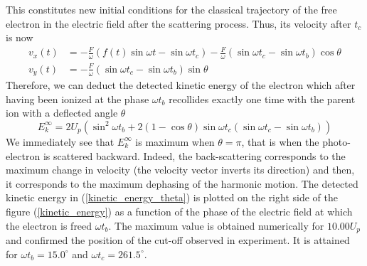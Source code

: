 \documentclass[a4paper]{article}
\begin{document}
This constitutes new initial conditions for the classical trajectory of the free electron in the electric field after the scattering process. Thus, its velocity after $t_{c}$ is now
\begin{align}
v_{x}(t)&=-\frac{F}{\omega} \left(f(t)\sin{\omega t}-\sin{\omega t_{c}} \right) - \frac{F}{\omega} \left( \sin{\omega t_{c}}-\sin{\omega t_{b}} \right) \cos{\theta} \\
v_{y}(t)&=-\frac{F}{\omega} \left( \sin{\omega t_{c}} - \sin{\omega t_{b}} \right) \sin{\theta}
\end{align}
Therefore, we can deduct the detected kinetic energy of the electron which after having been ionized at the phase $\omega t_{b}$ recollides exactly one time with the parent ion with a deflected angle $\theta$
\begin{equation}
E_{k}^{\infty}=2 U_{p} \left(\sin^{2}{\omega t_{b}}+2(1-\cos{\theta})\sin{\omega t_{c}} \left(\sin{\omega t_{c}}-\sin{\omega t_{b}}\right)\right)
\label{kinetic_energy_theta}
\end{equation}
We immediately see that $E_{k}^{\infty}$ is maximum when $\theta=\pi$, that is when the photo-electron is scattered backward. Indeed, the back-scattering corresponds to the maximum change in velocity (the velocity vector inverts its direction) and then, it corresponds to the maximum dephasing of the harmonic motion. The detected kinetic energy in (\ref{kinetic_energy_theta}) is plotted on the right side of the figure (\ref{kinetic_energy}) as a function of the phase of the electric field at which the electron is freed $\omega t_{b}$.
The maximum value is obtained numerically for $10.00 U_{p}$ and confirmed the position of the cut-off observed in experiment. It is attained for $\omega t_{b}=15.0^{\circ}$ and $\omega t_{c}=261.5^{\circ}$.



\end{document}
